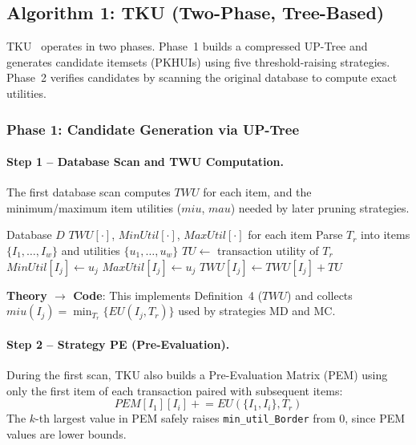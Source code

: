 \subsection{Algorithm 1: TKU (Two-Phase, Tree-Based)}
\label{sec:tku}

TKU~\cite{ref_tku_paper} operates in two phases. Phase~1 builds a compressed UP-Tree and generates candidate itemsets (PKHUIs) using five threshold-raising strategies. Phase~2 verifies candidates by scanning the original database to compute exact utilities.

\subsubsection{Phase 1: Candidate Generation via UP-Tree}

\paragraph{Step 1 -- Database Scan and TWU Computation.}
The first database scan computes $TWU$ for each item, and the minimum/maximum item utilities ($miu$, $mau$) needed by later pruning strategies.

\begin{algorithm}[H]
\caption{TWU, MIU, MAU Computation --- First DB Scan (Ref: \texttt{tku/tku.go}, \texttt{preEvaluation}, lines 216--269)}
\label{alg:twu}
\begin{algorithmic}[1]
\Require Database $D$
\Ensure $TWU[\cdot]$, $MinUtil[\cdot]$, $MaxUtil[\cdot]$ for each item
    \State Parse $T_r$ into items $\{I_1, \ldots, I_w\}$ and utilities $\{u_1, \ldots, u_w\}$
    \State $TU \leftarrow$ transaction utility of $T_r$
            \State $MinUtil[I_j] \leftarrow u_j$ 
        \EndIf
            \State $MaxUtil[I_j] \leftarrow u_j$ 
        \EndIf
        \State $TWU[I_j] \leftarrow TWU[I_j] + TU$ 
    \EndFor
\EndFor
\end{algorithmic}
\end{algorithm}

\textbf{Theory $\to$ Code}: This implements Definition~4 ($TWU$) and collects $miu(I_j) = \min_{T_r}\{EU(I_j,T_r)\}$ used by strategies MD and MC.

\paragraph{Step 2 -- Strategy PE (Pre-Evaluation).}
During the first scan, TKU also builds a Pre-Evaluation Matrix (PEM) using only the first item of each transaction paired with subsequent items:
\begin{equation}
    PEM[I_1][I_i] \mathrel{+}= EU(\{I_1, I_i\}, T_r)
\end{equation}
The $k$-th largest value in PEM safely raises \texttt{min\_util\_Border} from 0, since PEM values are lower bounds.

